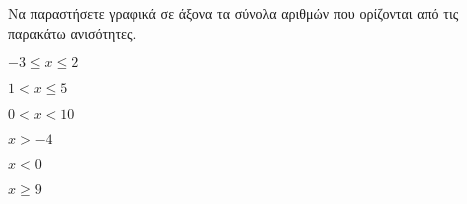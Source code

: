 Να παραστήσετε γραφικά σε άξονα τα σύνολα αριθμών που ορίζονται από τις παρακάτω ανισότητες.
\begin{multicols}{3}
\begin{alist}[leftmargin=2mm]
\item $ -3\leq x\leq 2 $
\item $ 1<x\leq 5 $
\item $ 0<x<10 $
\item $ x>-4 $
\item $ x<0 $
\item $ x\geq 9 $
\end{alist}
\end{multicols}
